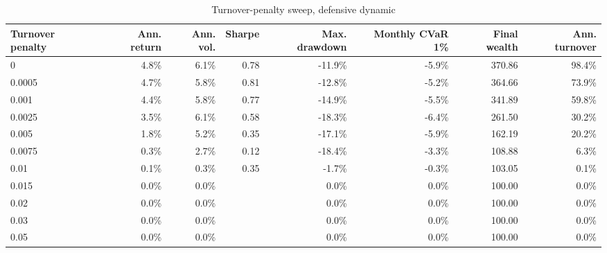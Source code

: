 ﻿\begin{table}[!htbp]
\centering
\caption{Turnover-penalty sweep, defensive dynamic}
\label{tab:allocation-turnover-penalty-defensive}
\small
\setlength{\tabcolsep}{5pt}
\renewcommand{\arraystretch}{1.12}
\begin{adjustbox}{center,max width=\linewidth}
\begin{tabular}{lrrrrrrr}
\toprule
Turnover penalty & Ann. return & Ann. vol. & Sharpe & Max. drawdown & Monthly CVaR 1\% & Final wealth & Ann. turnover \\
\midrule
0 & 4.8\% & 6.1\% & 0.78 & -11.9\% & -5.9\% & 370.86 & 98.4\% \\
0.0005 & 4.7\% & 5.8\% & 0.81 & -12.8\% & -5.2\% & 364.66 & 73.9\% \\
0.001 & 4.4\% & 5.8\% & 0.77 & -14.9\% & -5.5\% & 341.89 & 59.8\% \\
0.0025 & 3.5\% & 6.1\% & 0.58 & -18.3\% & -6.4\% & 261.50 & 30.2\% \\
0.005 & 1.8\% & 5.2\% & 0.35 & -17.1\% & -5.9\% & 162.19 & 20.2\% \\
0.0075 & 0.3\% & 2.7\% & 0.12 & -18.4\% & -3.3\% & 108.88 & 6.3\% \\
0.01 & 0.1\% & 0.3\% & 0.35 & -1.7\% & -0.3\% & 103.05 & 0.1\% \\
0.015 & 0.0\% & 0.0\% &  & 0.0\% & 0.0\% & 100.00 & 0.0\% \\
0.02 & 0.0\% & 0.0\% &  & 0.0\% & 0.0\% & 100.00 & 0.0\% \\
0.03 & 0.0\% & 0.0\% &  & 0.0\% & 0.0\% & 100.00 & 0.0\% \\
0.05 & 0.0\% & 0.0\% &  & 0.0\% & 0.0\% & 100.00 & 0.0\% \\
\bottomrule
\end{tabular}
\end{adjustbox}
\end{table}
